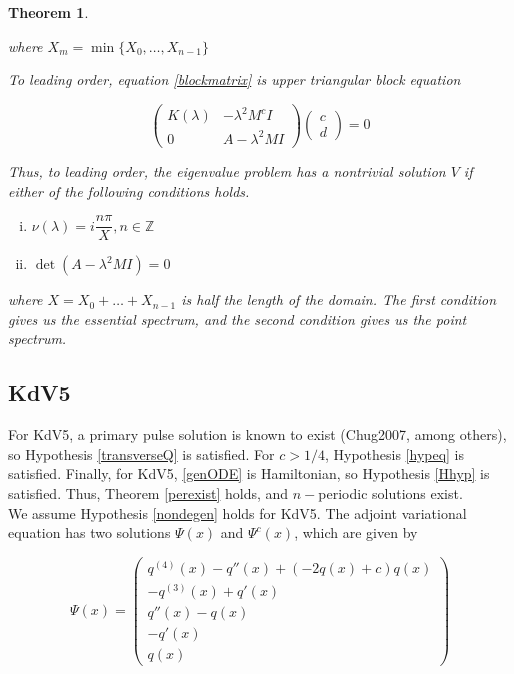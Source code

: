 \documentclass[12pt]{article}
\def\Z{{\mathbb Z}}
\newtheorem{theorem}{Theorem}
\begin{document}
\begin{theorem}
\begin{enumerate}
where $X_m = \min \{X_0, \dots, X_{n-1}\}$

\end{enumerate}

To leading order, equation \eqref{blockmatrix} is upper triangular block equation

\begin{equation}\label{blocktri}
\begin{pmatrix}
K(\lambda) & -\lambda^2 M^c I  \\
0 & A - \lambda^2 MI 
\end{pmatrix}
\begin{pmatrix}c \\ d \end{pmatrix} = 0
\end{equation}

Thus, to leading order, the eigenvalue problem has a nontrivial solution $V$ if either of the following conditions holds.

\begin{enumerate}[(i)]
\item $\nu(\lambda) = i \dfrac{n \pi}{X}, n \in \Z$ 
\item $\det(A - \lambda^2 MI) = 0$
\end{enumerate}

where $X = X_0 + \dots + X_{n-1}$ is half the length of the domain. The first condition gives us the essential spectrum, and the second condition gives us the point spectrum.

\end{theorem}

\subsection{KdV5}

For KdV5, a primary pulse solution is known to exist (Chug2007, among others), so Hypothesis \ref{transverseQ} is satisfied. For $c > 1/4$, Hypothesis \ref{hypeq} is satisfied. Finally, for KdV5, \eqref{genODE} is Hamiltonian, so Hypothesis \ref{Hhyp} is satisfied. Thus, Theorem \ref{perexist} holds, and $n-$periodic solutions exist.\\

We assume Hypothesis \ref{nondegen} holds for KdV5. The adjoint variational equation has two solutions $\Psi(x)$ and $\Psi^c(x)$, which are given by

\begin{equation}\label{KdV5psi}
\Psi(x) = \begin{pmatrix}
q^{(4)}(x) - q''(x) + (-2q(x) + c)q(x)\\
-q^{(3)}(x) + q'(x) \\
q''(x) - q(x) \\
-q'(x) \\
q(x)
\end{pmatrix}
\end{equation}
\end{document}
